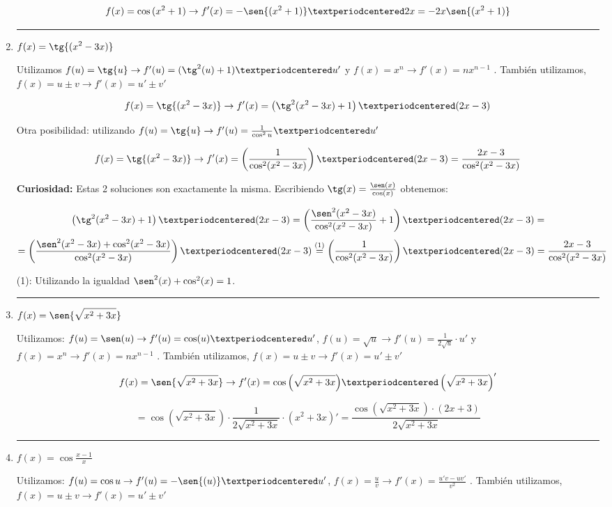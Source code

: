 \documentclass[palatino,nosec,nochap,nobuilddate]{Docencia}
\begin{document}
\begin{enumerate}
\[
	f(x) = \cos{(x^2+1)} \to f'(x) = -\sen{(x^2+1)}·2x = -2x\sen{(x^2+1)}
\]

\vspace{0.3cm}\hrule\vspace{0.6cm} \item $\displaystyle f(x) = \tg{(x^2-3x)}$

Utilizamos $f(u) = \tg{u} \to f'(u) = (\tg^2(u)+1)·u'$ y $f(x) = x^n \to f'(x) = nx^{n-1}$
. También utilizamos, $f(x) = u \pm v \to f'(x) = u' \pm v'$

\[
	f(x) = \tg{(x^2-3x)} \to f'(x) = \left(\tg^2(x^2-3x)+1\right)·(2x-3)
\]


Otra posibilidad: utilizando $f(u) = \tg{u} \to f'(u) = \frac{1}{\cos^2{u}}·u'$

\[
	f(x) = \tg{(x^2-3x)} \to f'(x) = \left(\frac{1}{\cos^2(x^2-3x)}\right)·(2x-3) = \frac{2x-3}{\cos^2(x^2-3x)}
\]

\textbf{Curiosidad:} Estas 2 soluciones son exactamente la misma. Escribiendo $\tg(x) = \frac{\sen(x)}{\cos(x)}$ obtenemos:

\[
\left(\tg^2(x^2-3x)+1\right)·(2x-3) = \left(\frac{\sen^2(x^2-3x)}{\cos^2(x^2-3x)}+1\right)·(2x-3) =
\]
\[
= \left(\frac{\sen^2(x^2-3x)+\cos^2(x^2-3x)}{\cos^2(x^2-3x)}\right)·(2x-3) \overset{(1)}{=}  \left(\frac{1}{\cos^2(x^2-3x)}\right)·(2x-3) = \frac{2x-3}{\cos^2(x^2-3x)}
\]

(1): Utilizando la igualdad $\sen^2(x) + \cos^2(x) = 1$.
\vspace{0.3cm}\hrule\vspace{0.6cm} \item $\displaystyle f(x) = \sen{\sqrt{x^2+3x}} $

Utilizamos: $f(u) = \sen(u) \to f'(u) = \cos(u)·u'$, $f(u) = \sqrt{u} \to f'(u) = \frac{1}{2\sqrt{u}}·u'$ y $f(x) = x^n \to f'(x) = nx^{n-1}$
. También utilizamos, $f(x) = u \pm v \to f'(x) = u' \pm v'$

\[
	f(x) = \sen{\sqrt{x^2+3x}} \to f'(x) = \cos{\left(\sqrt{x^2+3x}\right)}·\left(\sqrt{x^2+3x}\right)' \]

\[= \cos{\left(\sqrt{x^2+3x}\right)}·\frac{1}{2\sqrt{x^2+3x}}·(x^2+3x)'  = \frac{\cos{\left(\sqrt{x^2+3x}\right)}·(2x+3)}{2\sqrt{x^2+3x}}
\]


\vspace{0.3cm}\hrule\vspace{0.6cm} \item $\displaystyle f(x) =  \cos{\frac{x-1}{x}}$

Utilizamos: $f(u) = \cos{u} \to f'(u) = -\sen{(u)}·u'$, $f(x) = \frac{u}{v} \to f'(x) = \frac{u'v-uv'}{v^2}$
. También utilizamos, $f(x) = u \pm v \to f'(x) = u' \pm v'$


\end{enumerate}
\end{document}
